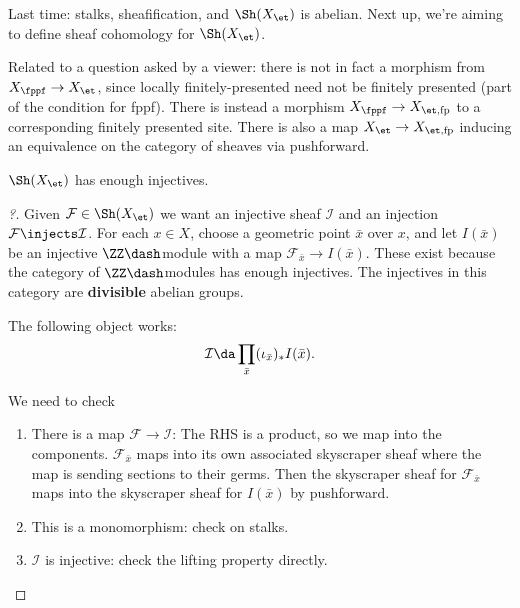 Last time: stalks, sheafification, and \(\Sh(X_{\et})\) is abelian. Next
up, we're aiming to define sheaf cohomology for \(\Sh(X_\et)\).

\begin{remark}[Esoteric!]

Related to a question asked by a viewer: there is not in fact a morphism
from \(X_{\fppf} \to X_{\et}\), since locally finitely-presented need
not be finitely presented (part of the condition for fppf). There is
instead a morphism \(X_{\fppf}\to X_{\et, \text{fp}}\) to a
corresponding finitely presented site. There is also a map
\(X_{\et} \to X_{\et, \text{fp}}\) inducing an equivalence on the
category of sheaves via pushforward.

\end{remark}

\begin{theorem}

\(\Sh(X_\et)\) has enough injectives.

\end{theorem}

\begin{proof}[?]

Given \(\mathcal{F}\in \Sh(X_\et)\) we want an injective sheaf
\(\mathcal{I}\) and an injection \(\mathcal{F}\injects \mathcal{I}\).
For each \(x\in X\), choose a geometric point \(\bar x\) over \(x\), and
let \(I(\bar x)\) be an injective \(\ZZ\dash\)module with a map
\(\mathcal{F}_{\bar x} \to I(\bar x)\). These exist because the category
of \(\ZZ\dash\)modules has enough injectives. The injectives in this
category are \textbf{divisible} abelian groups.

\begin{claim}

The following object works:
\begin{align*}  
\mathcal{I} \da \prod_{\bar x} (\iota_{\bar x})_* I(\bar x)
.\end{align*}

\end{claim}

We need to check

\begin{enumerate}
\def\labelenumi{\arabic{enumi}.}
\item
  There is a map \(\mathcal{F}\to \mathcal{I}\): The RHS is a product,
  so we map into the components. \(\mathcal{F}_{\bar x}\) maps into its
  own associated skyscraper sheaf where the map is sending sections to
  their germs. Then the skyscraper sheaf for \(\mathcal{F}_{\bar x}\)
  maps into the skyscraper sheaf for \(I(\bar x)\) by pushforward.
\item
  This is a monomorphism: check on stalks.
\item
  \(\mathcal{I}\) is injective: check the lifting property directly.
\end{enumerate}

\end{proof}

